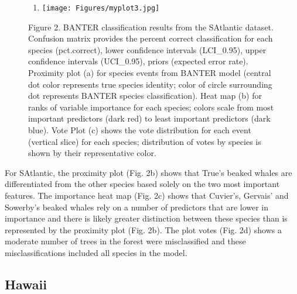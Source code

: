 \documentclass[
  letterpaper,
  DIV=11,
  numbers=noendperiod]{scrartcl}
\providecommand{\tightlist}{%
  \setlength{\itemsep}{0pt}\setlength{\parskip}{0pt}}\usepackage{longtable,booktabs,array}
\begin{document}
\begin{figure}
\begin{minipage}[b]{0.33\linewidth}
{}

\end{minipage}%
%
\begin{minipage}[b]{0.33\linewidth}

{\centering 

\begin{enumerate}
\def\labelenumi{\alph{enumi})}
\setcounter{enumi}{2}
\tightlist
\item
  \texttt{[image: Figures/myplot3.jpg]}
\end{enumerate}

}

\end{minipage}%
\newline
\begin{minipage}[b]{0.33\linewidth}

{\centering 

Figure 2. BANTER classification results from the SAtlantic dataset.
Confusion matrix provides the percent correct classification for each
species (pct.correct), lower confidence intervals (LCI\_0.95), upper
confidence intervals (UCI\_0.95), priors (expected error rate).
Proximity plot (a) for species events from BANTER model (central dot
color represents true species identity; color of circle surrounding dot
represents BANTER species classification). Heat map (b) for ranks of
variable importance for each species; colors scale from most important
predictors (dark red) to least important predictors (dark blue). Vote
Plot (c) shows the vote distribution for each event (vertical slice) for
each species; distribution of votes by species is shown by their
representative color.

}

\end{minipage}%

\end{figure}

For SAtlantic, the proximity plot (Fig. 2b) shows that True's beaked
whales are differentiated from the other species based solely on the two
most important features. The importance heat map (Fig. 2c) shows that
Cuvier's, Gervais' and Sowerby's beaked whales rely on a number of
predictors that are lower in importance and there is likely greater
distinction between these species than is represented by the proximity
plot (Fig. 2b). The plot votes (Fig. 2d) shows a moderate number of
trees in the forest were misclassified and these misclassifications
included all species in the model.

\hypertarget{hawaii}{%
\subsection{Hawaii}\label{hawaii}}
\end{document}
